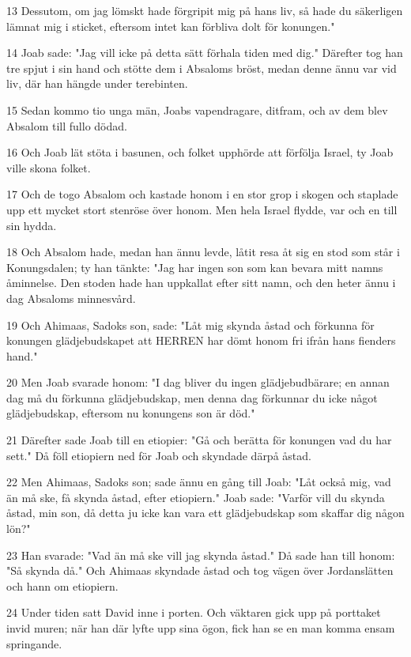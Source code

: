 \par 13 Dessutom, om jag lömskt hade förgripit mig på hans liv, så hade du säkerligen lämnat mig i sticket, eftersom intet kan förbliva dolt för konungen."
\par 14 Joab sade: "Jag vill icke på detta sätt förhala tiden med dig." Därefter tog han tre spjut i sin hand och stötte dem i Absaloms bröst, medan denne ännu var vid liv, där han hängde under terebinten.
\par 15 Sedan kommo tio unga män, Joabs vapendragare, ditfram, och av dem blev Absalom till fullo dödad.
\par 16 Och Joab lät stöta i basunen, och folket upphörde att förfölja Israel, ty Joab ville skona folket.
\par 17 Och de togo Absalom och kastade honom i en stor grop i skogen och staplade upp ett mycket stort stenröse över honom. Men hela Israel flydde, var och en till sin hydda.
\par 18 Och Absalom hade, medan han ännu levde, låtit resa åt sig en stod som står i Konungsdalen; ty han tänkte: "Jag har ingen son som kan bevara mitt namns åminnelse. Den stoden hade han uppkallat efter sitt namn, och den heter ännu i dag Absaloms minnesvård.
\par 19 Och Ahimaas, Sadoks son, sade: "Låt mig skynda åstad och förkunna för konungen glädjebudskapet att HERREN har dömt honom fri ifrån hans fienders hand."
\par 20 Men Joab svarade honom: "I dag bliver du ingen glädjebudbärare; en annan dag må du förkunna glädjebudskap, men denna dag förkunnar du icke något glädjebudskap, eftersom nu konungens son är död."
\par 21 Därefter sade Joab till en etiopier: "Gå och berätta för konungen vad du har sett." Då föll etiopiern ned för Joab och skyndade därpå åstad.
\par 22 Men Ahimaas, Sadoks son; sade ännu en gång till Joab: "Låt också mig, vad än må ske, få skynda åstad, efter etiopiern." Joab sade: "Varför vill du skynda åstad, min son, då detta ju icke kan vara ett glädjebudskap som skaffar dig någon lön?"
\par 23 Han svarade: "Vad än må ske vill jag skynda åstad." Då sade han till honom: "Så skynda då." Och Ahimaas skyndade åstad och tog vägen över Jordanslätten och hann om etiopiern.
\par 24 Under tiden satt David inne i porten. Och väktaren gick upp på porttaket invid muren; när han där lyfte upp sina ögon, fick han se en man komma ensam springande.
